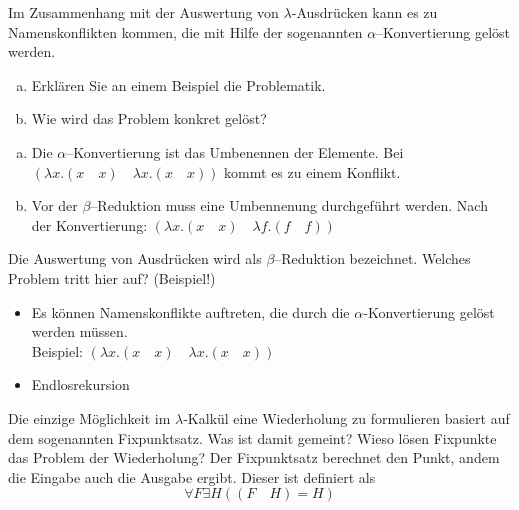 \begin{card}
  Im Zusammenhang mit der Auswertung von $\lambda$-Ausdrücken kann es zu Namenskonflikten kommen, die mit Hilfe der sogenannten
  $\alpha$--Konvertierung gelöst werden.
  \begin{enumerate}[a)]
    \item Erklären Sie an einem Beispiel die Problematik.
    \item Wie wird das Problem konkret gelöst?
  \end{enumerate}
  \hr
  \begin{enumerate}[a)]
    \item Die $\alpha$--Konvertierung ist das Umbenennen der Elemente. Bei $(\lambda x.(x \quad x) \quad \lambda x.(x \quad x))$ kommt es zu einem Konflikt.
    \item Vor der $\beta$--Reduktion muss eine Umbennenung durchgeführt werden. Nach der Konvertierung: $(\lambda x.(x \quad x) \quad \lambda f.(f \quad f))$
  \end{enumerate}
\end{card}

\begin{card}
  Die Auswertung von Ausdrücken wird als $\beta$–Reduktion bezeichnet. Welches Problem tritt hier auf? (Beispiel!)
  \hr
  \begin{itemize}
    \item Es können Namenskonflikte auftreten, die durch die $\alpha$-Konvertierung gelöst werden müssen.\\
      Beispiel: $(\lambda x.(x \quad x) \quad \lambda x.(x \quad x))$
    \item Endlosrekursion
  \end{itemize}
\end{card}

\begin{card}
  Die einzige Möglichkeit im $\lambda$-Kalkül eine Wiederholung zu formulieren basiert auf dem sogenannten Fixpunktsatz. Was ist damit gemeint? Wieso lösen Fixpunkte das Problem der Wiederholung?
  \hr
  Der Fixpunktsatz berechnet den Punkt, andem die Eingabe auch die Ausgabe ergibt. Dieser ist definiert als
  \[
    \forall F \exists H ((F \quad H) = H)
  \]
\end{card}
